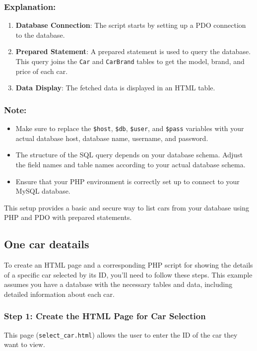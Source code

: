 \documentclass[11pt]{article}
\begin{document}
\subsubsection{Explanation:}
\label{sec:orged183c0}
\begin{enumerate}
\item \textbf{Database Connection}: The script starts by setting up a PDO
connection to the database.

\item \textbf{Prepared Statement}: A prepared statement is used to query the
database. This query joins the \texttt{Car} and \texttt{CarBrand} tables to get the
model, brand, and price of each car.

\item \textbf{Data Display}: The fetched data is displayed in an HTML table.
\end{enumerate}

\subsubsection{Note:}
\label{sec:orgdb29b83}
\begin{itemize}
\item Make sure to replace the \texttt{\$host}, \texttt{\$db}, \texttt{\$user}, and \texttt{\$pass}
variables with your actual database host, database name, username, and
password.
\item The structure of the SQL query depends on your database schema. Adjust
the field names and table names according to your actual database
schema.
\item Ensure that your PHP environment is correctly set up to connect to
your MySQL database.
\end{itemize}

This setup provides a basic and secure way to list cars from your
database using PHP and PDO with prepared statements.

\subsection{One car deatails}
\label{sec:orgaa0b000}
To create an HTML page and a corresponding PHP script for showing the
details of a specific car selected by its ID, you'll need to follow
these steps. This example assumes you have a database with the necessary
tables and data, including detailed information about each car.

\subsubsection{Step 1: Create the HTML Page for Car Selection}
\label{sec:org6b8f0cf}
This page (\texttt{select\_car.html}) allows the user to enter the ID of the car
they want to view.
\end{document}

